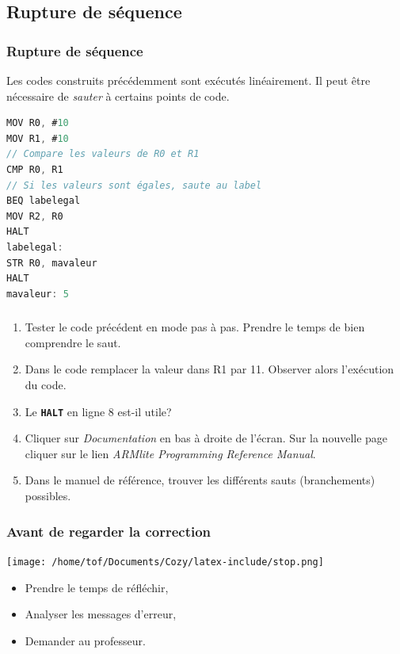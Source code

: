 \documentclass[svgnames,11pt]{beamer}
\begin{document}
\subsection{Rupture de séquence}
\begin{frame}[fragile]
    \frametitle{Rupture de séquence}
Les codes construits précédemment sont exécutés linéairement. Il peut être nécessaire de \emph{sauter} à certains points de code.

\begin{center}
    \begin{lstlisting}[language=C , basicstyle=\small, xleftmargin=2em, xrightmargin=2em]
MOV R0, #10
MOV R1, #10
// Compare les valeurs de R0 et R1
CMP R0, R1
// Si les valeurs sont égales, saute au label
BEQ labelegal 
MOV R2, R0
HALT 
labelegal: 
STR R0, mavaleur
HALT
mavaleur: 5
\end{lstlisting}
    \label{CODE}
    \end{center}

\end{frame}
\begin{frame}
    \frametitle{}

\begin{activite}
\begin{enumerate}
    \item Tester le code précédent en mode pas à pas. Prendre le temps de bien comprendre le saut.
    \item Dans le code remplacer la valeur dans R1 par 11. Observer alors l'exécution du code.
    \item Le \textbf{\texttt{HALT}} en ligne 8 est-il utile?
    \item Cliquer sur \emph{Documentation} en bas à droite de l'écran. Sur la nouvelle page cliquer sur le lien \emph{ARMlite Programming Reference Manual}.
    \item Dans le manuel de référence, trouver les différents sauts (branchements) possibles.
\end{enumerate}
\end{activite}

\end{frame}
\begin{frame}
    \frametitle{Avant de regarder la correction}
\begin{center}
    \centering
    \texttt{[image: /home/tof/Documents/Cozy/latex-include/stop.png]}
    \end{center}
{\Large
    \begin{itemize}
        \item Prendre le temps de réfléchir,
        \item Analyser les messages d'erreur,
        \item Demander au professeur.
    \end{itemize}
}
\end{frame}
\end{document}
